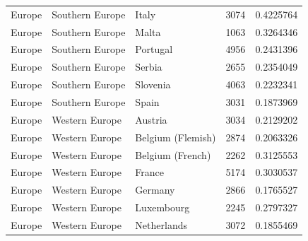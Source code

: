 \begin{table}
\begin{tabular}{lllll}
Europe & Southern Europe & Italy & 3074 & 0.4225764 \\
Europe & Southern Europe & Malta & 1063 & 0.3264346 \\
Europe & Southern Europe & Portugal & 4956 & 0.2431396 \\
Europe & Southern Europe & Serbia & 2655 & 0.2354049 \\
Europe & Southern Europe & Slovenia & 4063 & 0.2232341 \\
Europe & Southern Europe & Spain & 3031 & 0.1873969 \\
Europe & Western Europe & Austria & 3034 & 0.2129202 \\
Europe & Western Europe & Belgium (Flemish) & 2874 & 0.2063326 \\
Europe & Western Europe & Belgium (French) & 2262 & 0.3125553 \\
Europe & Western Europe & France & 5174 & 0.3030537 \\
Europe & Western Europe & Germany & 2866 & 0.1765527 \\
Europe & Western Europe & Luxembourg & 2245 & 0.2797327 \\
Europe & Western Europe & Netherlands & 3072 & 0.1855469 \\
\end{tabular}
\end{table}
